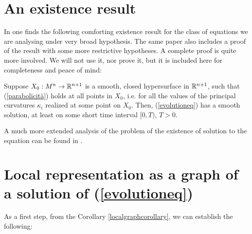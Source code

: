 \section{An existence result}
In \cite{huisken} one finds the following comforting existence result for the class of equations we are analysing under very broad hypothesis. The same paper also includes a proof of the result with some more restrictive hypotheses. A complete proof is quite more involved. We will not use it, nor prove it, but it is included here for completeness and peace of mind: 

\begin{theorem}
	Suppose $X_0 : M^n \rightarrow \mathbb{R}^{n+1}$ is a smooth, closed hypersurface in $\mathbb{R}^{n+1}$, such that (\ref{parabolicità}) holds at all points in $X_0$, i.e. for all the values of the principal curvatures $\kappa_{i}$ realized at some point on $X_0$. Then, (\ref{evolutioneq}) has a smooth solution, at least on some short time interval $[0, T)$, $T > 0$.  \label{existence}
\end{theorem}

A much more extended analysis of the problem of the existence of solution to the equation can be found in \cite{Gerhardt Curvature}. 


\section{Local representation as a graph of a solution of (\ref{evolutioneq})}
\label{representation as graph}
As a first step, from the Corollary \ref{localgraphcorollary}, we can establish the following:

